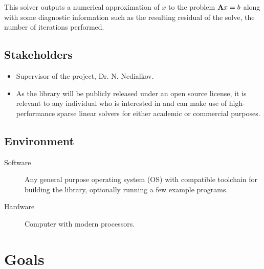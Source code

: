 \documentclass{article}
\begin{document}
This solver outputs a numerical approximation of \(x\) to the problem
\(\mathbf{A}x = b\) along with some diagnostic information such as the resulting
residual of the solve, the number of iterations performed.

\subsection{Stakeholders}

\begin{itemize}
\item Supervisor of the project, Dr. N. Nedialkov.
\item As the library will be publicly released under an open source license, it is
  relevant to any individual who is interested in and can make use of
  high-performance sparse linear solvers for either academic or commercial
  purposes.
\end{itemize}

\subsection{Environment}


\begin{description}
\item[Software] Any general purpose operating system (OS) with compatible toolchain
  for building the library, optionally running a few example programs.
\item[Hardware] Computer with modern processors.
\end{description}

\section{Goals}
\end{document}
